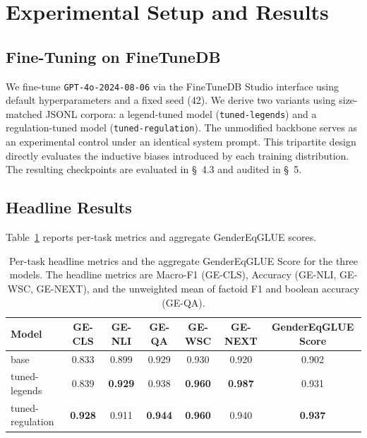 \documentclass[pdflatex,sn-mathphys-num]{sn-jnl}%
\theoremstyle{thmstyleone}%
\theoremstyle{thmstyletwo}%
\theoremstyle{thmstylethree}%
\begin{document}
\section{Experimental Setup and Results}

\subsection{Fine-Tuning on FineTuneDB}

We fine-tune \texttt{GPT-4o-2024-08-06} via the FineTuneDB Studio interface
using default hyperparameters and a fixed seed (42). We derive two variants
using size-matched JSONL corpora: a legend-tuned model (\texttt{tuned-legends})
and a regulation-tuned model (\texttt{tuned-regulation}). The unmodified
backbone serves as an experimental control under an identical system prompt.
This tripartite design directly evaluates the inductive biases introduced by
each training distribution. The resulting checkpoints are evaluated in \S~4.3
and audited in \S~5.

\subsection{Headline Results}

Table~\ref{tab:headline_results} reports per-task metrics and aggregate
GenderEqGLUE scores. 

\begin{table}[htbp]
\centering
\caption{Per-task headline metrics and the aggregate GenderEqGLUE Score for the three models. The headline metrics are Macro-F1 (GE-CLS), Accuracy (GE-NLI, GE-WSC, GE-NEXT), and the unweighted mean of factoid F1 and boolean accuracy (GE-QA).}
\label{tab:headline_results}
\vspace{2mm}
\begin{tabular}{lcccccc}
\toprule
\textbf{Model} & \textbf{GE-CLS} & \textbf{GE-NLI} & \textbf{GE-QA} &
\textbf{GE-WSC} & \textbf{GE-NEXT} & \textbf{GenderEqGLUE Score} \\
\midrule
base & 0.833 & 0.899 & 0.929 & 0.930 & 0.920 & 0.902 \\
tuned-legends & 0.839 & \textbf{0.929} & 0.938 & \textbf{0.960} & \textbf{0.987}
& 0.931 \\
tuned-regulation & \textbf{0.928} & 0.911 & \textbf{0.944} & \textbf{0.960} &
0.940 & \textbf{0.937} \\
\bottomrule
\end{tabular}
\end{table}
\end{document}
